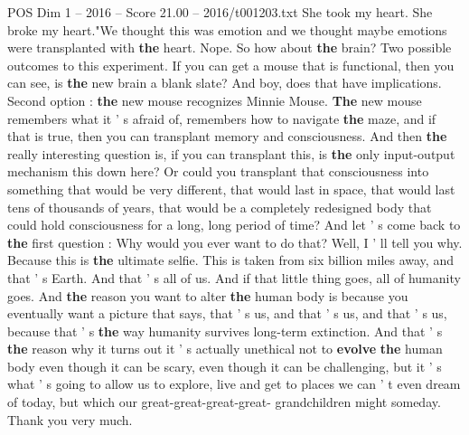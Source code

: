 \begin{textsample}{POS Dim 1 – 2016 – Score 21.00 – 2016/t001203.txt}
She took my heart.
She broke my heart."We thought this was emotion and we thought maybe emotions were transplanted with \textbf{the} heart.
Nope.
So how about \textbf{the} brain?
Two possible outcomes to this experiment.
If you can get a mouse that is functional, then you can see, is \textbf{the} new brain a blank slate?
And boy, does that have implications.
Second option : \textbf{the} new mouse recognizes Minnie Mouse. \textbf{The} new mouse remembers what it ' s afraid of, remembers how to navigate \textbf{the} maze, and if that is true, then you can transplant memory and consciousness.
And then \textbf{the} really interesting question is, if you can transplant this, is \textbf{the} only input-output mechanism this down here?
Or could you transplant that consciousness into something that would be very different, that would last in space, that would last tens of thousands of years, that would be a completely redesigned body that could hold consciousness for a long, long period of time?
And let ' s come back to \textbf{the} first question : Why would you ever want to do that?
Well, I ' ll tell you why.
Because this is \textbf{the} ultimate selfie.
This is taken from six billion miles away, and that ' s Earth.
And that ' s all of us.
And if that little thing goes, all of humanity goes.
And \textbf{the} reason you want to alter \textbf{the} human body is because you eventually want a picture that says, that ' s us, and that ' s us, and that ' s us, because that ' s \textbf{the} way humanity survives long-term extinction.
And that ' s \textbf{the} reason why it turns out it ' s actually unethical not to \textbf{evolve} \textbf{the} human body even though it can be scary, even though it can be challenging, but it ' s what ' s going to allow us to explore, live and get to places we can ' t even dream of today, but which our great-great-great-great- grandchildren might someday.
Thank you very much.

\end{textsample}
